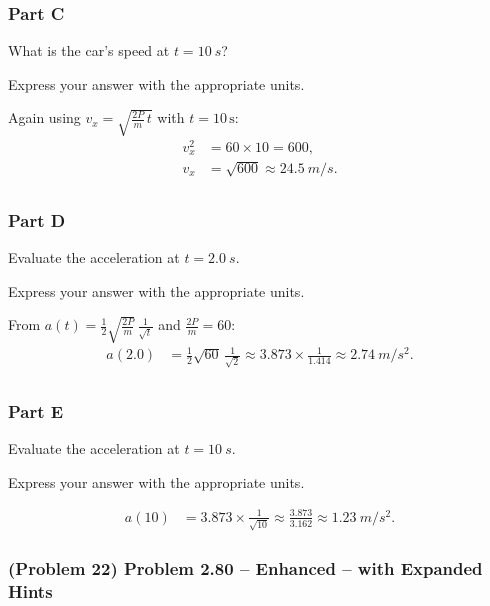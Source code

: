\subsubsection{Part C}
What is the car's speed at \( t = \SI{10}{s}\)?

Express your answer with the appropriate units.

\begin{solution}
	Again using \( v_x = \sqrt{\tfrac{2P}{m}\,t}\) with \( t = 10\,\mathrm{s}\):
	\begin{align*}
		v_x^2 &= 60 \times 10 = 600,\\
		v_x &= \sqrt{600} \approx \SI{24.5}{m/s}.\\
	\end{align*}
\end{solution}

\subsubsection{Part D}
Evaluate the acceleration at \( t = \SI{2.0}{s}\).

Express your answer with the appropriate units.

\begin{solution}
	From \( a(t) = \frac{1}{2}\sqrt{\frac{2P}{m}}\,\frac{1}{\sqrt{t}} \) and \( \tfrac{2P}{m}=60\):
	\begin{align*}
		a(2.0) &= \frac{1}{2}\sqrt{60}\,\frac{1}{\sqrt{2}} \approx 3.873\times\frac{1}{1.414} \approx \SI{2.74}{m/s^2}.\\
	\end{align*}
\end{solution}

\subsubsection{Part E}
Evaluate the acceleration at \( t = \SI{10}{s}\).

Express your answer with the appropriate units.

\begin{solution}
	\begin{align*}
		a(10) &= 3.873\times\frac{1}{\sqrt{10}} \approx \frac{3.873}{3.162} \approx \SI{1.23}{m/s^2}.
	\end{align*}
\end{solution}

\newpage


\subsubsection{(Problem 22) Problem 2.80 -- Enhanced -- with Expanded Hints}

